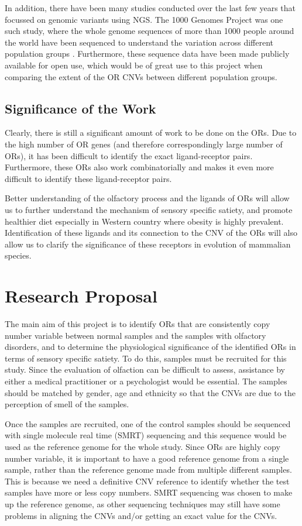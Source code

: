 \documentclass[a4paper, 12pt]{article}
\begin{document}
In addition, there have been many studies conducted over the last few years that focussed on genomic variants using NGS.
The 1000 Genomes Project was one such study, where the whole genome sequences of more than 1000 people around the world have been sequenced to understand the variation across different population groups \citep{Durbin2010}.
Furthermore, these sequence data have been made publicly available for open use, which would be of great use to this project when comparing the extent of the OR CNVs between different population groups.

\subsection*{Significance of the Work}

Clearly, there is still a significant amount of work to be done on the ORs.
Due to the high number of OR genes (and therefore correspondingly large number of ORs), it has been difficult to identify the exact ligand-receptor pairs.
Furthermore, these ORs also work combinatorially and makes it even more difficult to identify these ligand-receptor pairs.

Better understanding of the olfactory process and the ligands of ORs will allow us to further understand the mechanism of sensory specific satiety, and promote healthier diet especially in Western country where obesity is highly prevalent.
Identification of these ligands and its connection to the CNV of the ORs will also allow us to clarify the significance of these receptors in evolution of mammalian species.

\section*{Research Proposal}

The main aim of this project is to identify ORs that are consistently copy number variable between normal samples and the samples with olfactory disorders, and to determine the physiological significance of the identified ORs in terms of sensory specific satiety.
To do this, samples must be recruited for this study.
Since the evaluation of olfaction can be difficult to assess, assistance by either a medical practitioner or a psychologist would be essential.
The samples should be matched by gender, age and ethnicity so that the CNVs are due to the perception of smell of the samples.

Once the samples are recruited, one of the control samples should be sequenced with single molecule real time (SMRT) sequencing and this sequence  would be used as the reference genome for the whole study.
Since ORs are highly copy number variable, it is important to have a good reference genome from a single sample, rather than the reference genome made from multiple different samples.
This is because we need a definitive CNV reference to identify whether the test samples have more or less copy numbers.
SMRT sequencing was chosen to make up the reference genome, as other sequencing techniques may still have some problems in aligning the CNVs and/or getting an exact value for the CNVs.
\end{document}
